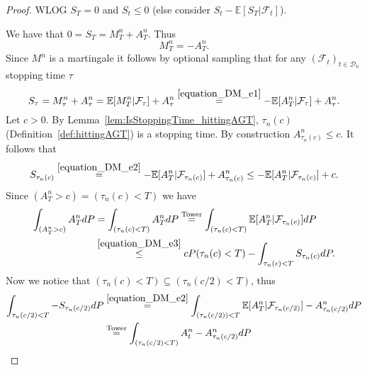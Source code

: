 \begin{proof}
  WLOG $S_T=0$ and $S_t\leq 0$ (else consider $S_t-\mathbb{E}\left[S_T\vert\mathcal{F}_{t}\right]$).

  We have that $0=S_T=M^n_T+A^n_T$. Thus
  \begin{equation}\label{equation_DM_e1}
  M^n_T=-A^n_T.
  \end{equation}
  Since $M^n$ is a martingale it follows by optional sampling that for any $(\mathcal{F}_t)_{t\in\mathcal{D}_n}$ stopping time $\tau$
  \begin{equation}\label{equation_DM_e2}
  S_\tau=M^n_\tau+A^n_\tau = \mathbb{E}[M^n_T\vert\mathcal{F}_\tau]+A^n_\tau\stackrel{\eqref{equation_DM_e1}}{=} -\mathbb{E}[A^n_T\vert\mathcal{F}_\tau]+A^n_\tau.
  \end{equation}
  Let $c>0$. By Lemma~\ref{lem:IsStoppingTime_hittingAGT}, $\tau_n(c)$ (Definition~\ref{def:hittingAGT}) is a stopping time.
  By construction $A^n_{\tau_n(c)}\leq c$. It follows that
  \begin{equation}\label{equation_DM_e3}
  S_{\tau_n(c)}\stackrel{\eqref{equation_DM_e2}}{=}-\mathbb{E}[A^n_T\vert\mathcal{F}_{\tau_n(c)}]+A^n_{\tau_n(c)}\leq -\mathbb{E}[A^n_T\vert\mathcal{F}_{\tau_n(c)}]+c.
  \end{equation}
  Since $(A^n_T>c)=(\tau_n(c)<T)$ we have
  \begin{align}\nonumber
  \int_{(A^n_T>c)}A^n_TdP&=\int_{(\tau_n(c)<T)}A^n_TdP\stackrel{\mathrm{Tower}}{=}\int_{(\tau_n(c)<T)}\mathbb{E}[A^n_T\vert\mathcal{F}_{\tau_n(c)}]dP\\
  &\stackrel{\eqref{equation_DM_e3}}{\leq} cP(\tau_n(c)<T)-\int_{\tau_n(c)<T}S_{\tau_n(c)}dP.\label{equation_DM_e4}
  \end{align}
  Now we notice that $(\tau_n(c)<T)\subseteq (\tau_n(c/2)<T)$, thus
  \begin{align}\nonumber
  \int_{\tau_n(c/2)<T}-S_{\tau_n(c/2)}dP
  &\stackrel{\eqref{equation_DM_e2}}{=}\int_{(\tau_n(c/2))<T}\mathbb{E}[A^n_T\vert\mathcal{F}_{\tau_n(c/2)}]-A^n_{\tau_n(c/2)}dP \nonumber
  \\
  &\stackrel{\mathrm{Tower}}{=}\int_{(\tau_n(c/2)<T)}A^n_t-A^n_{\tau_n(c/2)}dP\nonumber

\end{align}
\end{proof}
